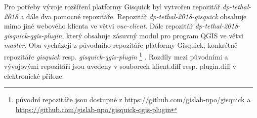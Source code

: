 \newpage
Pro potřeby vývoje rozšíření platformy Gisquick byl vytvořen repozitář 
\textit{dp-tethal-2018} a dále dva pomocné repozitáře. 
Repozitář \textit{dp-tethal-2018-gisquick}
obsahuje mimo jiné webového klienta ve větvi \textit{vue-client}.
Dále repozitář \textit{dp-tethal-2018-gisquick-qgis-plugin}, který obsahuje zásuvný 
modul pro program QGIS ve větvi \textit{master}.
Oba vycházejí z původního repozitáře platformy Gisquick, konkrétně 
repozitáře \textit{gisquick} resp. \textit{gisquick-qgis-plugin}
\footnote{původní repozitáře jsou dostupné z \url{https://github.com/gislab-npo/gisquick} a \newline \url{https://github.com/gislab-npo/gisquick-qgis-plugin}}
.
\newline
Rozdíly mezi původními a vývojovými repozitáři jsou uvedeny v 
souborech klient.diff resp. plugin.diff v elektronické příloze. 

